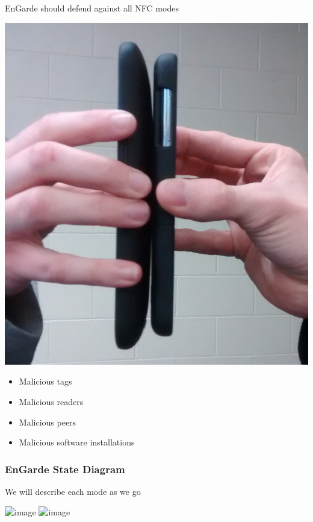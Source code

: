 \documentclass[unknownkeysallowed]{beamer}
\begin{document}
\begin{frame}
\begin{center}
\begin{block}{EnGarde should defend against all NFC modes}
\begin{center}
        \includegraphics[width=\linewidth,height=0.3\textheight,keepaspectratio]{figures/peer.jpg}

        \vspace{3mm}

        \begin{minipage}{.7\textwidth}
          \begin{itemize}
            \item{Malicious tags}
            \item{Malicious readers}
            \item{Malicious peers}
            \item{Malicious software installations}
          \end{itemize}
        \end{minipage}

      \end{center}
    \end{block}
  \end{center}
\end{frame}



\begin{frame}
\frametitle{EnGarde State Diagram}
\begin{center}
  \begin{center}\textcolor{uipoppy}{We will describe each mode as we go}\end{center}\vspace{3mm}
  \includegraphics<1>[width=.8\linewidth,height=.7\textheight,keepaspectratio]{figures/engarde/states0.png}
  \includegraphics<2>[width=.8\linewidth,height=.7\textheight,keepaspectratio]{figures/engarde/states1.png}%
\end{center}
\end{frame}
\end{document}
